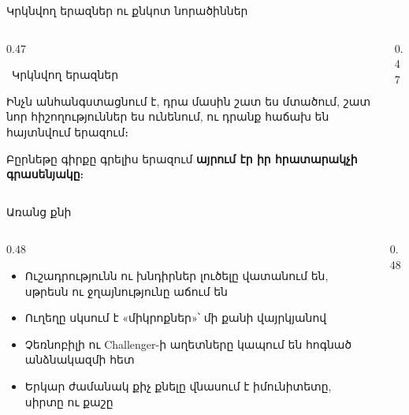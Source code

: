 \begin{frame}{Կրկնվող երազներ ու քնկոտ նորածիններ}
  \begin{columns}[T]
    \begin{column}{0.47\textwidth}
      \begin{card}[colback=peach!35!cardwhite]
        \ {\blackfont Կրկնվող երազներ}\par\smallskip
        Ինչն անհանգստացնում է, դրա մասին շատ ես մտածում, շատ նոր հիշողություններ ես ունենում, ու դրանք հաճախ են հայտնվում երազում։\par\smallskip
        Բըրնեթը գիրքը գրելիս երազում \textbf{այրում էր իր հրատարակչի գրասենյակը}։
      \end{card}
    \end{column}
    \begin{column}{0.47\textwidth}
    \end{column}
  \end{columns}
\end{frame}

\begin{frame}{Առանց քնի}
  \begin{columns}[c]
    \begin{column}{0.48\textwidth}
      \begin{itemize}
        \item Ուշադրությունն ու խնդիրներ լուծելը վատանում են, սթրեսն ու ջղայնությունը աճում են
        \item Ուղեղը սկսում է «միկրոքներ»՝ մի քանի վայրկյանով
        \item Չեռնոբիլի ու Challenger-ի աղետները կապում են հոգնած անձնակազմի հետ
        \item Երկար ժամանակ քիչ քնելը վնասում է իմունիտետը, սիրտը ու քաշը
      \end{itemize}
    \end{column}
    \begin{column}{0.48\textwidth}
      \centering
    \end{column}
  \end{columns}
\end{frame}

